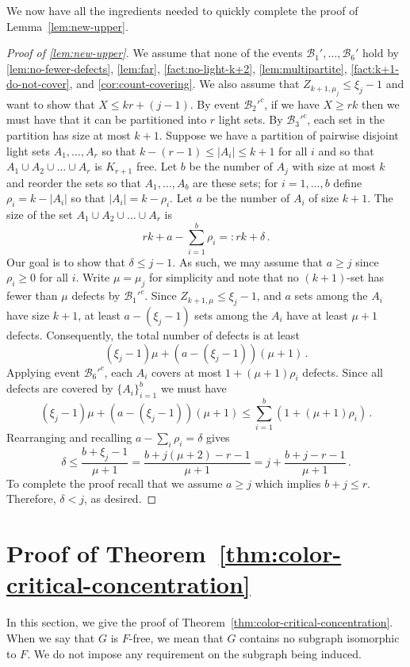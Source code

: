 \documentclass[11pt]{article}
\theoremstyle{definition}
\theoremstyle{remark}
\newcommand{\cB}{\mathcal{B}}
\begin{document}
We now have all the ingredients needed to quickly complete the proof of Lemma~\ref{lem:new-upper}.


\begin{proof}[Proof of \cref{lem:new-upper}]
    We assume that none of the events $\cB_1',\ldots,\cB_6'$ hold by \cref{lem:no-fewer-defects}, \cref{lem:far}, \cref{fact:no-light-k+2}, \cref{lem:multipartite}, \cref{fact:k+1-do-not-cover}, and \cref{cor:count-covering}.  We also assume that $Z_{k+1,\mu_{j}} \leq \xi_{j} - 1$ and want to show that $X \leq kr + (j-1)$.  By event $\cB_2'^c$, if we have $X \geq rk$ then we must have that it can be partitioned into $r$ light sets.  
    By $\cB_3'^c$, each set in the partition has size at most $k+1$.  Suppose we have a partition of pairwise disjoint light sets $A_1,\ldots,A_r$ so that $k - (r - 1) \leq |A_i| \leq k+1$ for all $i$ and so that $A_1 \cup A_2 \cup \ldots \cup A_r$ is $K_{r+1}$ free.  Let $b$ be the number of $A_j$ with size at most $k$ and reorder the sets so that $A_1,\ldots,A_b$ are these sets; for $i = 1,\ldots, b$ define $\rho_i=k-|A_i|$  so that $|A_i| = k - \rho_i$.  Let $a$ be the number of $A_i$ of size $k+1$.  The size of the set $A_1 \cup A_2 \cup \ldots \cup A_r$ is $$rk + a - \sum_{i = 1}^b \rho_i =: rk + \delta\,.$$
    Our goal is to show that $\delta \leq j - 1$.  As such, we may assume that $a \geq j$ since $\rho_i \geq0$ for all $i$.  
    Write $\mu = \mu_{j}$ for simplicity and note that  no $(k+1)$-set has fewer than $\mu$ defects by $\cB_1'^c$. 
    Since $Z_{k+1,\mu} \leq \xi_j - 1$, and $a$  sets among the $A_i$ have size $k+1$, at least  $a - (\xi_j - 1)$ sets among the  $A_i$ have at least $\mu+1$ defects.  
    Consequently, the total number of defects is at least 
    $$(\xi_{j} - 1)\mu + (a - (\xi_{j} - 1))(\mu + 1)\,.$$
    Applying event $\cB_6'^c$, each $A_i$ covers at most $1 + (\mu+1)\rho_i$ defects.  Since all defects are covered by $\{A_i\}_{i = 1}^b$ we must have 
    $$(\xi_{j} - 1)\mu + (a - (\xi_{j} - 1))(\mu + 1) \leq \sum_{i = 1}^b(1 + (\mu + 1)\rho_i)\,.$$
    Rearranging and recalling $a - \sum_i \rho_i = \delta$ gives 
    $$\delta \leq \frac{b + \xi_{j} - 1}{\mu + 1} = \frac{b + j( \mu+2)-r-1}{ \mu+1} = j + \frac{b + j - r -1}{\mu+1}\,.$$
    To complete the proof recall that we assume $ a \ge j$ which implies $ b + j \le r$. Therefore,
    $\delta < j$, as desired.
\end{proof}



\section{Proof of Theorem~\ref{thm:color-critical-concentration}}
In this section, we give the proof of Theorem~\ref{thm:color-critical-concentration}.
When we say that $G$ is $F$-free, we mean that $G$ contains no subgraph isomorphic to $F$. We do not impose any requirement on the subgraph being induced. 
\end{document}
